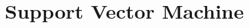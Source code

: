 \documentclass[../main]{subfiles}
\begin{document}
\chapter{Support Vector Machine}
\begin{introduction}
\item 
\end{introduction}
\end{document}

